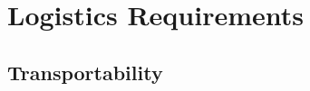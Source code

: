 \KNEADSECTIONNEWPAGE
\section{Logistics Requirements}
\label{lab:sec_Logistics}




% 


\KNEADSUBSECTIONNEWPAGE
\subsection{Transportability}
\label{lab:ssec_Logistics_Transportability}






